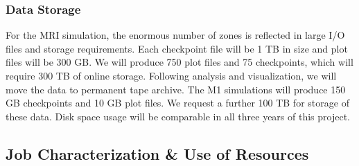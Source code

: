 \subsubsection{Data Storage}
For the MRI simulation, the enormous number of zones is reflected
in large I/O files and storage requirements.  Each checkpoint file
will be 1 TB in size and plot files will be 300 GB.  We will produce
750 plot files and 75 checkpoints, which will require 300 TB of online
storage.  Following analysis and visualization, we will move the data
to permanent tape archive.  
The M1 simulations will produce 150 GB checkpoints and 10 GB plot files.
We request a further 100 TB for storage of these data.
Disk space usage will be comparable in all three years of this project.

\subsection{Job Characterization \& Use of Resources}
\label{sec:jobs}

